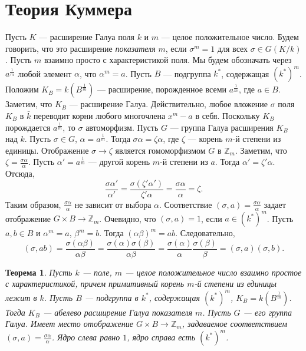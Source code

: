 \documentclass[12pt, titlepage, oneside]{amsbook}
\newcommand{\ZZ}{\mathbb{Z}}
\newtheorem{theorem}{Теорема}[chapter]
\theoremstyle{definition}
\theoremstyle{remark}
\begin{document}
\section{Теория Куммера}

Пусть $K$ --- расширение Галуа поля $k$ и $m$ --- целое положительное число. Будем говорить, что это расширение \emph{показателя} $m$, если $\sigma^m=1$ для всех $\sigma\in G(K/k)$. Пусть $m$ взаимно просто с характеристикой поля. Мы будем обозначать через $a^{\frac{1}{m}}$ любой элемент $\alpha$, что $\alpha^m=a$. Пусть $B$ --- подгруппа $k^*$, содержащая $(k^*)^m$. Положим $K_B=k(B^{\frac{1}{m}})$ --- расширение, порожденное всеми $a^{\frac{1}{m}}$, где $a\in B$. Заметим, что $K_B$ --- расширение Галуа. Действительно, любое вложение $\sigma$ поля $K_B$ в $\bar{k}$ переводит корни любого многочлена $x^m-a$ в себя. Поскольку $K_B$ порождается $a^{\frac{1}{m}}$, то $\sigma$ автоморфизм. Пусть $G$ --- группа Галуа расширения $K_B$ над $k$. Пусть $\sigma\in G$, $\alpha=a^{\frac{1}{m}}$. Тогда $\sigma\alpha=\zeta\alpha$, где $\zeta$ --- корень $m$-й степени из единицы. Отображение $\sigma\rightarrow\zeta$ является гомоморфизмом $G$ в $\ZZ_m$. Заметим, что $\zeta=\frac{\sigma\alpha}{\alpha}$. Пусть $\alpha'=a^{\frac{1}{m}}$ --- другой корень $m$-й степени из $a$. Тогда  $\alpha'=\zeta'\alpha$. Отсюда, $$\frac{\sigma\alpha'}{\alpha'}=\frac{\sigma(\zeta'\alpha')}{\zeta'\alpha}=\frac{\sigma\alpha}{\alpha}=\zeta.$$ Таким образом, $\frac{\sigma\alpha}{\alpha}$ не зависит от выбора $\alpha$. Соответствие $(\sigma,a)=\frac{\sigma\alpha}{\alpha}$ задает отображение $G\times B\rightarrow\ZZ_m$. Очевидно, что $(\sigma,a)=1$, если $a\in (k^*)^m$. Пусть $a,b\in B$ и $\alpha^m=a$, $\beta^m=b$. Тогда $(\alpha\beta)^m=ab$. Следовательно, $$(\sigma,ab)=\frac{\sigma(\alpha\beta)}{\alpha\beta}=\frac{\sigma(\alpha)\sigma(\beta)}{\alpha\beta}=\frac{\sigma(\alpha)}{\alpha}\frac{\sigma(\beta)}{\beta}=(\sigma,a)(\sigma,b).$$

\begin{theorem}
\label{Kum1}
Пусть $k$ --- поле, $m$ --- целое положительное число взаимно простое с характеристикой, причем примитивный корень $m$-й степени из единицы лежит в $k$. Пусть $B$ --- подгруппа в $k^*$, содержащая $(k^*)^m$, $K_B=k(B^{\frac{1}{m}})$. Тогда $K_B$ --- абелево расширение Галуа показателя $m$. Пусть $G$ --- его группа Галуа. Имеет место отображение $G\times B\rightarrow\ZZ_m$, задаваемое соответствием $(\sigma,a)=\frac{\sigma\alpha}{\alpha}$. Ядро слева равно $1$, ядро справа есть $(k^*)^m$.
\end{theorem}
\end{document}

